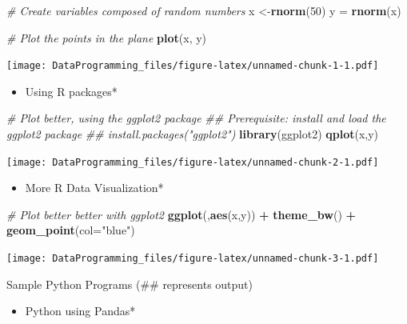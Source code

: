 \documentclass[]{book}
\newenvironment{Shaded}{\begin{snugshade}}{\end{snugshade}}
\newcommand{\CommentTok}[1]{\textcolor[rgb]{0.56,0.35,0.01}{\textit{#1}}}
\newcommand{\DataTypeTok}[1]{\textcolor[rgb]{0.13,0.29,0.53}{#1}}
\newcommand{\DecValTok}[1]{\textcolor[rgb]{0.00,0.00,0.81}{#1}}
\newcommand{\KeywordTok}[1]{\textcolor[rgb]{0.13,0.29,0.53}{\textbf{#1}}}
\newcommand{\NormalTok}[1]{#1}
\newcommand{\OperatorTok}[1]{\textcolor[rgb]{0.81,0.36,0.00}{\textbf{#1}}}
\newcommand{\StringTok}[1]{\textcolor[rgb]{0.31,0.60,0.02}{#1}}
\providecommand{\tightlist}{%
  \setlength{\itemsep}{0pt}\setlength{\parskip}{0pt}}
\begin{document}
\begin{Shaded}
\begin{Highlighting}[]
\CommentTok{# Create variables composed of random numbers}
\NormalTok{x <-}\KeywordTok{rnorm}\NormalTok{(}\DecValTok{50}\NormalTok{) }
\NormalTok{y =}\StringTok{ }\KeywordTok{rnorm}\NormalTok{(x)}

\CommentTok{# Plot the points in the plane }
\KeywordTok{plot}\NormalTok{(x, y)}
\end{Highlighting}
\end{Shaded}

\texttt{[image: DataProgramming\_files/figure-latex/unnamed-chunk-1-1.pdf]}

\begin{itemize}
\tightlist
\item
  Using R packages*
\end{itemize}

\begin{Shaded}
\begin{Highlighting}[]
\CommentTok{# Plot better, using the ggplot2 package }
\CommentTok{## Prerequisite: install and load the ggplot2 package}
\CommentTok{## install.packages("ggplot2")}
\KeywordTok{library}\NormalTok{(ggplot2)}
\KeywordTok{qplot}\NormalTok{(x,y)}
\end{Highlighting}
\end{Shaded}

\texttt{[image: DataProgramming\_files/figure-latex/unnamed-chunk-2-1.pdf]}

\begin{itemize}
\tightlist
\item
  More R Data Visualization*
\end{itemize}

\begin{Shaded}
\begin{Highlighting}[]
\CommentTok{# Plot better better with ggplot2}
\KeywordTok{ggplot}\NormalTok{(,}\KeywordTok{aes}\NormalTok{(x,y)) }\OperatorTok{+}\StringTok{ }\KeywordTok{theme_bw}\NormalTok{() }\OperatorTok{+}\StringTok{ }\KeywordTok{geom_point}\NormalTok{(}\DataTypeTok{col=}\StringTok{"blue"}\NormalTok{)}
\end{Highlighting}
\end{Shaded}

\texttt{[image: DataProgramming\_files/figure-latex/unnamed-chunk-3-1.pdf]}

Sample Python Programs (\#\# represents output)

\begin{itemize}
\tightlist
\item
  Python using Pandas*
\end{itemize}
\end{document}
